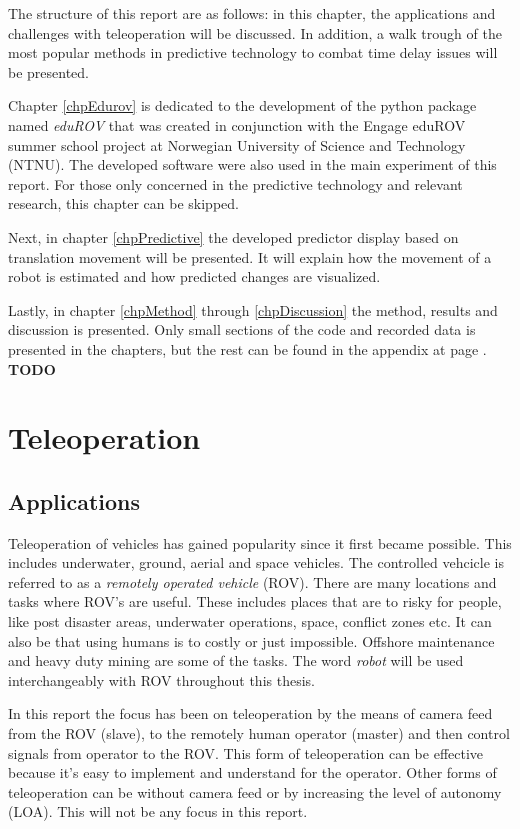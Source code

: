 The structure of this report are as follows: in this chapter, the applications and challenges with teleoperation will be discussed. In addition, a walk trough of the most popular methods in predictive technology to combat time delay issues will be presented.

Chapter \ref{chpEdurov} is dedicated to the development of the python package named \textit{eduROV} that was created in conjunction with the Engage eduROV summer school project at Norwegian University of Science and Technology (NTNU). The developed software were also used in the main experiment of this report. For those only concerned in the predictive technology and relevant research, this chapter can be skipped.

Next, in chapter \ref{chpPredictive} the developed predictor display based on translation movement will be presented. It will explain how the movement of a robot is estimated and how predicted changes are visualized.

Lastly, in chapter \ref{chpMethod} through \ref{chpDiscussion} the method, results and discussion is presented. Only small sections of the code and recorded data is presented in the chapters, but the rest can be found in the appendix at page \pageref{appendix}. \textbf{TODO}

\section{Teleoperation}


\subsection{Applications}
Teleoperation of vehicles has gained popularity since it first became possible. This includes underwater, ground, aerial and space vehicles. The controlled vehcicle is referred to as a \emph{remotely operated vehicle} (ROV). There are many locations and tasks where ROV's are useful. These includes places that are to risky for people, like post disaster areas, underwater operations, space, conflict zones etc. It can also be that using humans is to costly or just impossible. Offshore maintenance and heavy duty mining are some of the tasks. The word \emph{robot} will be used interchangeably with ROV throughout this thesis.

In this report the focus has been on teleoperation by the means of camera feed from the ROV (slave), to the remotely human operator (master) and then control signals from operator to the ROV. This form of teleoperation can be effective because it's easy to implement and understand for the operator. Other forms of teleoperation can be without camera feed or by increasing the level of autonomy (LOA). This will not be any focus in this report.

